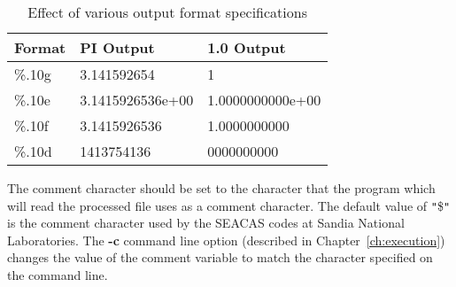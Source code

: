\begin{longtable}{lll}
\caption{Effect of various output format specifications}\\
Format & PI Output & 1.0 Output \\
\hline
\%.10g &  3.141592654      & 1  \\
\%.10e &  3.1415926536e+00 & 1.0000000000e+00  \\
\%.10f &  3.1415926536     & 1.0000000000  \\
\%.10d &  1413754136       & 0000000000  \\
\end{longtable}

The comment character should be set to the character that the program
which will read the processed file uses as a comment character. The
default value of \texttt{"}\$\texttt{"} is the comment character used
by the SEACAS codes at Sandia National Laboratories.  The \textbf{-c}
command line option (described in Chapter~\ref{ch:execution}) changes
the value of the comment variable to match the character specified on
the command line.
